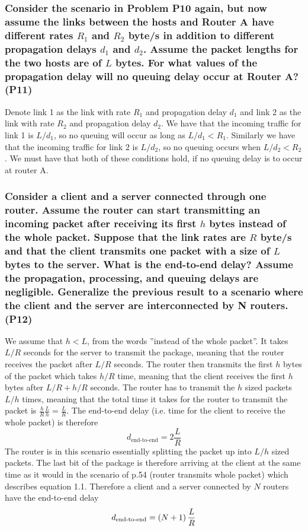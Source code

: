 \subsubsection{Consider the scenario in Problem P10 again, but now assume the links between the hosts and Router A have different rates $R_1$ and $R_2$ byte/s in addition
to different propagation delays $d_1$ and $d_2$. Assume the packet lengths for the two hosts are of $L$ bytes. For what values of the propagation delay will no queuing delay occur at Router A? (P11)}

Denote link 1 as the link with rate $R_1$ and propagation delay $d_1$ and link 2 as the link with rate $R_2$ and propagation delay $d_2$. We have that the incoming traffic for link 1 is $L/d_1$, so no queuing will occur as long as $L/d_1 < R_1$. Similarly we have that the incoming traffic for link 2 is $L/d_2$, so no queuing occurs when $L/d_2 < R_2$. We must have that both of these conditions hold, if no queuing delay is to occur at router A.


\subsubsection{Consider a client and a server connected through one router. Assume the router can start transmitting an incoming packet after receiving its first $h$ bytes instead of the whole packet. Suppose that the link rates are $R$ byte/s and that the client transmits one packet with a size of $L$ bytes to the server. What is the end-to-end delay? Assume the propagation, processing, and queuing delays are negligible. Generalize the previous result to a scenario where the client and the server are interconnected by N routers. (P12)}

We assume that $h < L$, from the words ''instead of the whole packet''. It takes $L/R$ seconds for the server to transmit the package, meaning that the router receives the packet after $L/R$ seconds. The router then transmits the first $h$ bytes of the packet which takes $h/R$ time, meaning that the client receives the first $h$ bytes after $L/R + h/R$ seconds. The router has to transmit the $h$ sized packets $L/h$ times, meaning that the total time it takes for the router to transmit the packet is $\frac{h}{R} \frac{L}{h} = \frac{L}{R}$. The end-to-end delay (i.e. time for the client to receive the whole packet) is therefore
\begin{equation*}
    d_{\text{end-to-end}} = 2 \frac{L}{R}
\end{equation*}
The router is in this scenario essentially splitting the packet up into $L/h$ sized packets. The last bit of the package is therefore arriving at the client at the same time as it would in the scenario of p.54 (router transmits whole packet) which describes equation 1.1. Therefore a client and a server connected by $N$ routers have the end-to-end delay
\begin{equation*}
    d_{\text{end-to-end}} = \left (N + 1\right) \frac{L}{R}
\end{equation*}

